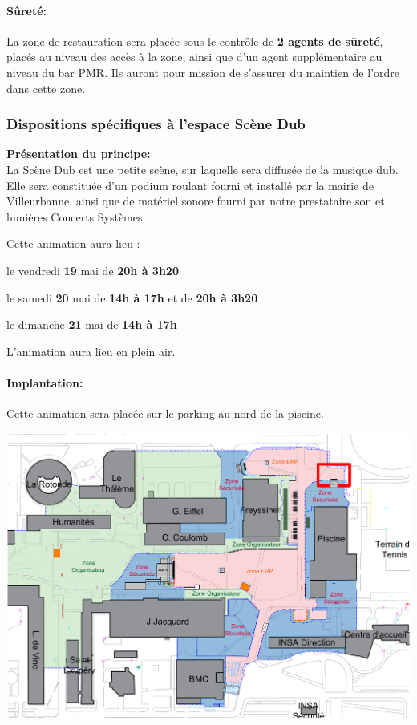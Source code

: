 \documentclass[hidelinks, paper=a4, fontsize=13pt]{report}
\begin{document}
\paragraph{Sûreté:}

La zone de restauration sera placée sous le contrôle de \textbf{2 agents de sûreté}, placés au niveau des accès à la zone, ainsi que d'un agent supplémentaire au niveau du bar PMR. Ils auront pour mission de s'assurer du maintien de l'ordre dans cette zone.

\subsubsection{Dispositions spécifiques à l'espace Scène Dub}

\textbf{Présentation du principe:}\\

La Scène Dub est une petite scène, sur laquelle sera diffusée de la musique dub. Elle sera constituée d'un podium roulant fourni et installé par la mairie de Villeurbanne, ainsi que de matériel sonore fourni par notre prestataire son et lumières Concerts Systèmes.

Cette animation aura lieu :
\begin{list}{•}{}
	\item le vendredi \textbf{19} mai de \textbf{20h à 3h20}
	\item le samedi \textbf{20} mai de \textbf{14h à 17h} et de \textbf{20h à 3h20}
	\item le dimanche \textbf{21} mai de \textbf{14h à 17h}
\end{list}

L’animation aura lieu en plein air.

\paragraph{Implantation:}
Cette animation sera placée sur le parking au nord de la piscine.
\begin{center}
	\includegraphics[width=.8\textwidth,keepaspectratio]{Exports/Plan_24h_44eme-3e_Scene}
\end{center}
\end{document}
